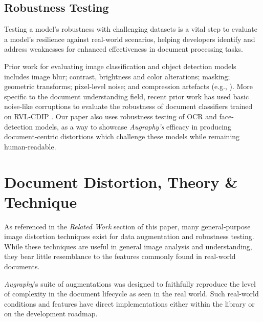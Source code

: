 \documentclass[runningheads]{llncs}
\begin{document}
\subsection{Robustness Testing}

Testing a model's robustness with challenging datasets is a vital step to evaluate a model's resilience against real-world scenarios, helping developers identify and address weaknesses for enhanced effectiveness in document processing tasks.

Prior work for evaluating image classification and object detection models includes image blur; contrast, brightness and color alterations; masking; geometric transforms; pixel-level noise; and compression artefacts (e.g., \cite{image-quality-impact,imagenet-c,pathology-recommendations,Hosseini2017-kn-google-api,face-recognition-impact,pathology-schomig,Vasiljevic2016-al-bluring-impact}).
More specific to the document understanding field, recent prior work has used basic noise-like corruptions to evaluate the robustness of document classifiers trained on RVL-CDIP \cite{saifullah-2022}.
Our paper also uses robustness testing of OCR and face-detection models, as a way to showcase \emph{Augraphy's} efficacy in producing document-centric distortions which challenge these models while remaining human-readable.

\section{Document Distortion, Theory \& Technique}
As referenced in the \emph{Related Work} section of this paper, many general-purpose image distortion techniques exist for data augmentation and robustness testing. While these techniques are useful in general image analysis and understanding, they bear little resemblance to the features commonly found in real-world documents.

\emph{Augraphy}'s suite of augmentations was designed to faithfully reproduce the level of complexity in the document lifecycle as seen in the real world. Such real-world conditions and features have direct implementations either within the library or on the development roadmap.
\end{document}
